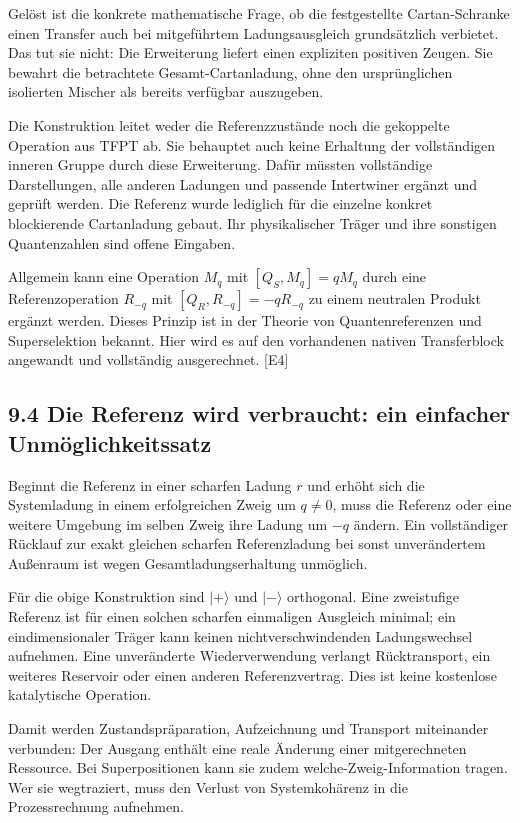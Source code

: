 Gelöst ist die konkrete mathematische Frage, ob die festgestellte
Cartan-Schranke einen Transfer auch bei mitgeführtem Ladungsausgleich
grundsätzlich verbietet. Das tut sie nicht: Die Erweiterung liefert
einen expliziten positiven Zeugen. Sie bewahrt die betrachtete
Gesamt-Cartanladung, ohne den ursprünglichen isolierten Mischer als
bereits verfügbar auszugeben.

Die Konstruktion leitet weder die Referenzzustände noch die gekoppelte
Operation aus TFPT ab. Sie behauptet auch keine Erhaltung der
vollständigen inneren Gruppe durch diese Erweiterung. Dafür müssten
vollständige Darstellungen, alle anderen Ladungen und passende
Intertwiner ergänzt und geprüft werden. Die Referenz wurde lediglich für
die einzelne konkret blockierende Cartanladung gebaut. Ihr
physikalischer Träger und ihre sonstigen Quantenzahlen sind offene
Eingaben.

Allgemein kann eine Operation \(M_q\) mit \([Q_S,M_q]=qM_q\) durch eine
Referenzoperation \(R_{-q}\) mit \([Q_R,R_{-q}]=-qR_{-q}\) zu einem
neutralen Produkt ergänzt werden. Dieses Prinzip ist in der Theorie von
Quantenreferenzen und Superselektion bekannt. Hier wird es auf den
vorhandenen nativen Transferblock angewandt und vollständig
ausgerechnet. {[}E4{]}

\subsection{9.4 Die Referenz wird verbraucht: ein einfacher
Unmöglichkeitssatz}\label{die-referenz-wird-verbraucht-ein-einfacher-unmuxf6glichkeitssatz}

Beginnt die Referenz in einer scharfen Ladung \(r\) und erhöht sich die
Systemladung in einem erfolgreichen Zweig um \(q\ne0\), muss die
Referenz oder eine weitere Umgebung im selben Zweig ihre Ladung um
\(-q\) ändern. Ein vollständiger Rücklauf zur exakt gleichen scharfen
Referenzladung bei sonst unverändertem Außenraum ist wegen
Gesamtladungserhaltung unmöglich.

Für die obige Konstruktion sind \(|+\rangle\) und \(|-\rangle\)
orthogonal. Eine zweistufige Referenz ist für einen solchen scharfen
einmaligen Ausgleich minimal; ein eindimensionaler Träger kann keinen
nichtverschwindenden Ladungswechsel aufnehmen. Eine unveränderte
Wiederverwendung verlangt Rücktransport, ein weiteres Reservoir oder
einen anderen Referenzvertrag. Dies ist keine kostenlose katalytische
Operation.

Damit werden Zustandspräparation, Aufzeichnung und Transport miteinander
verbunden: Der Ausgang enthält eine reale Änderung einer mitgerechneten
Ressource. Bei Superpositionen kann sie zudem welche-Zweig-Information
tragen. Wer sie wegtraziert, muss den Verlust von Systemkohärenz in die
Prozessrechnung aufnehmen.

